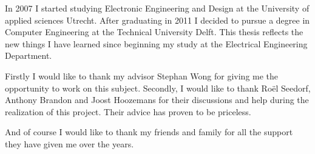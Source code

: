 

\vskip 1cm
In 2007 I started studying Electronic Engineering and Design at the University of applied sciences Utrecht. After graduating in 2011 I decided to pursue a degree in Computer Engineering at the Technical University Delft. This thesis reflects the new things I have learned since beginning my study at the Electrical Engineering Department.

Firstly I would like to thank my advisor Stephan Wong for giving me the opportunity to work on this subject. Secondly, I would like to thank Roël Seedorf, Anthony Brandon and Joost Hoozemans for their discussions and help during the realization of this project. Their advice has proven to be priceless.

And of course I would like to thank my friends and family for all the support they have given me over the years. 


\vskip 2cm
\noindent \AUTHOR \\
\PLACE \\
\DATE

